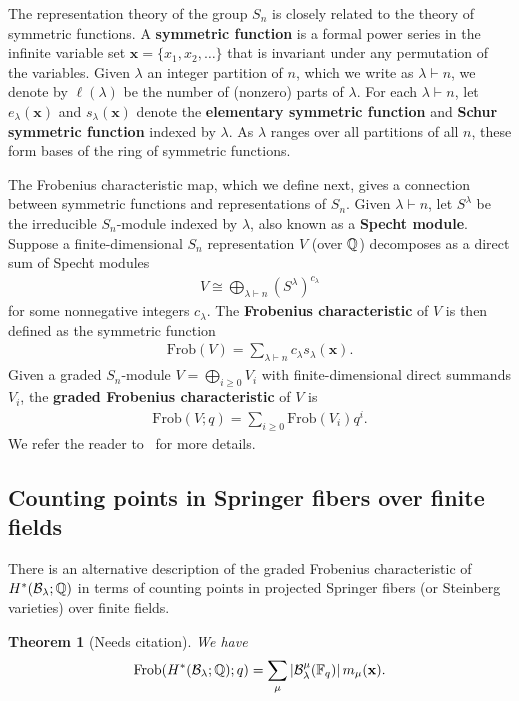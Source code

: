 \documentclass[11pt]{amsart}
\newtheorem{theorem}{Theorem}[section] %
\theoremstyle{definition}
\newcommand{\Frob}{\mathrm{Frob}}
\newcommand{\la}{\lambda}
\newcommand{\bx}{\mathbf{x}}
\newcommand{\Fq}{\mathbb{F}_q}
\begin{document}
The representation theory of the group $S_n$ is closely related to the theory of symmetric functions.
A {\bf symmetric function} is a formal power series in the infinite variable set $\bx = \{x_1,x_2,\dots \}$ that is invariant under any permutation of the variables.
Given $\la$ an integer partition of $n$, which we write as $\la\vdash n$,  we denote by $\ell(\la)$ be the number of (nonzero) parts of $\la$. For each $\la \vdash n$, let $e_\la(\bx)$ and $s_\la(\bx)$ denote the \textbf{elementary symmetric function} and \textbf{Schur symmetric function} indexed by $\lambda$.  As $\lambda$ ranges over all partitions of all $n$, these form bases of the ring of symmetric functions. 

The Frobenius characteristic map, which we define next, gives a connection between symmetric functions and representations of $S_n$. Given $\la\vdash n$, let $S^\la$ be the irreducible $S_n$-module indexed by $\la$, also known as a \textbf{Specht module}. Suppose a finite-dimensional $S_n$ representation $V$ (over $\mathbb{Q}$) decomposes as a direct sum of Specht modules
\begin{align}
V\cong \bigoplus_{\la\vdash n}(S^\la)^{c_\la}
\end{align}
for some nonnegative integers $c_\la$. The \textbf{Frobenius characteristic} of $V$ is then defined as the symmetric function
\begin{align}
\Frob(V) = \sum_{\la\vdash n} c_\la s_\la(\bx).
\end{align}
Given a graded $S_n$-module $V = \bigoplus_{i \geq 0} V_i$ with finite-dimensional direct summands $V_i$, the \textbf{graded Frobenius characteristic} of $V$ is
\begin{align}
\Frob(V;q) = \sum_{i\geq 0} \Frob(V_i)q^i.
\end{align}
We refer the reader to~\cite{Sagan} for more details.


\subsection{Counting points in Springer fibers over finite fields}

There is an alternative description of the graded Frobenius characteristic of $H^*(\mathcal{B}_\lambda;\mathbb{Q})$ in terms of counting points in projected Springer fibers (or Steinberg varieties) over finite fields.

\begin{theorem}[Needs citation]
We have
\[
\Frob(H^*(\cB_\lambda;\bQ);q) = \sum_\mu |\cB_\lambda^\mu(\Fq)|\,m_\mu(\bx).
\]
\end{theorem}
\end{document}
